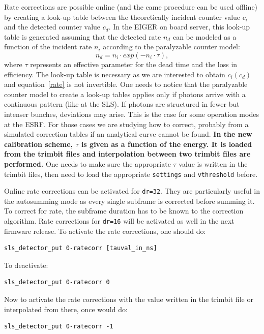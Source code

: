 \documentclass{article}
\begin{document}
Rate corrections are possible online (and the came procedure can be used offline) by creating a look-up table between the theoretically incident counter value $c_i$ and the detected counter value $c_d$. 
In the EIGER on board server, this look-up table is generated assuming that the detected rate $n_d$ can be modeled as a function of the incident rate $n_i$ according to the paralyzable counter model:
\begin{equation}
n_d= n_i \cdot exp(-n_i \cdot \tau),
\label{rate}
\end{equation}
where $\tau$ represents an effective parameter for the dead time and the loss in efficiency. The look-up table is necessary as we are interested to obtain $c_i(c_d)$ and equation~\ref{rate} is not invertible. One needs to notice that the paralyzable counter model to create a look-up tables applies only if photons arrive with a continuous pattern (like at the SLS). If photons are structured in fewer but intenser bunches, deviations may arise. This is the case for some operation modes at the ESRF. For those cases we are studying how to correct, probably from a simulated correction tables if an analytical curve cannot be found.  
\textbf{In the new calibration scheme, $\tau$ is given as a function of the energy. It is loaded from the trimbit files and interpolation between two trimbit files are performed.} One needs to make sure the appropriate $\tau$ value is written in the trimbit files, then need to load the appropriate {\tt{settings}} and {\tt{vthreshold}} before.

Online rate corrections can be activated for {\tt{dr=32}}. They are particularly useful in the autosumming mode as  every single subframe is corrected before summing it. To correct for rate, the subframe duration has to be known to the correction algorithm. Rate corrections for {\tt{dr=16}} will be activated as well in the next firmware release.     
To activate the rate corrections, one should do:\\
\begin{verbatim}
sls_detector_put 0-ratecorr [tauval_in_ns]
\end{verbatim}
To deactivate:
\begin{verbatim}
sls_detector_put 0-ratecorr 0
\end{verbatim}

 Now to activate the rate corrections with the value written in the trimbit file or interpolated from there, once would do: 
\begin{verbatim}
sls_detector_put 0-ratecorr -1
\end{verbatim}
\end{document}
